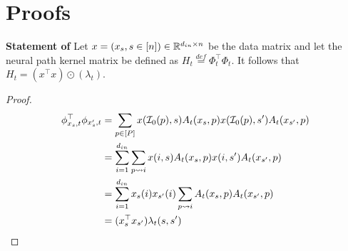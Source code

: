 \section{Proofs}
\textbf{Statement of }
 Let $x=(x_s,s\in [n])\in\mathbb{R}^{d_{in}\times n}$ be the data matrix and let the neural path kernel matrix be defined as $H_t\stackrel{def}=\Phi^\top_t\Phi_t$. It follows that $H_t= (x^\top x)\odot(\lambda_t)$. 
\begin{proof}
\begin{align*}
\phi^\top_{x_s,t}\phi_{x_s',t}&=\sum_{p\in[P]}x(\mathcal{I}_0(p),s)A_t(x_s,p) x(\mathcal{I}_0(p),s')A_t(x_{s'},p)\\
&=\sum_{i=1}^{d_{in}}\sum_{p\rightsquigarrow i}x(i,s)A_t(x_s,p) x(i,s')A_t(x_{s'},p)\\
&=\sum_{i=1}^{d_{in}}x_s(i)x_{s'}(i)\sum_{p\rightsquigarrow i} A_t(x_s,p)A_t(x_{s'},p)\\
&=(x^\top_s x_{s'})\lambda_t(s,s')
\end{align*}
\end{proof}

